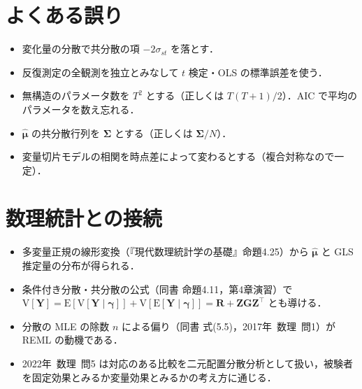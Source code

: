 \documentclass[a4paper,11pt,openany]{ltjsbook}
\newcommand{\kakomonSM}[2]{\mbox{#1年 数理 問#2}}
\newcommand{\E}{\mathrm{E}}
\newcommand{\V}{\mathrm{V}}
\newcommand{\transp}{^{\top}}
\begin{document}
\section{よくある誤り}\label{sec:08-err}
\begin{warnbox}
\begin{itemize}
\item 変化量の分散で共分散の項 $-2\sigma_{st}$ を落とす．
\item 反復測定の全観測を独立とみなして $t$ 検定・OLS の標準誤差を使う．
\item 無構造のパラメータ数を $T^2$ とする（正しくは $T(T+1)/2$）．AIC で平均のパラメータを数え忘れる．
\item $\hat{\bm\mu}$ の共分散行列を $\bm\Sigma$ とする（正しくは $\bm\Sigma/N$）．
\item 変量切片モデルの相関を時点差によって変わるとする（複合対称なので一定）．
\end{itemize}
\end{warnbox}

\section{数理統計との接続}\label{sec:08-link}
\begin{linkbox}
\begin{itemize}
\item 多変量正規の線形変換（『現代数理統計学の基礎』命題4.25）から $\hat{\bm\mu}$ と GLS 推定量の分布が得られる．
\item 条件付き分散・共分散の公式（同書 命題4.11，第4章演習）で $\V[\bm Y]=\E[\V[\bm Y\mid\bm\gamma]]+\V[\E[\bm Y\mid\bm\gamma]]=\bm R+\bm Z\bm G\bm Z\transp$ とも導ける．
\item 分散の MLE の除数 $n$ による偏り（同書 式(5.5)，\kakomonSM{2017}{1}）が REML の動機である．
\item \kakomonSM{2022}{5} は対応のある比較を二元配置分散分析として扱い，被験者を固定効果とみるか変量効果とみるかの考え方に通じる．
\end{itemize}
\end{linkbox}
\end{document}
